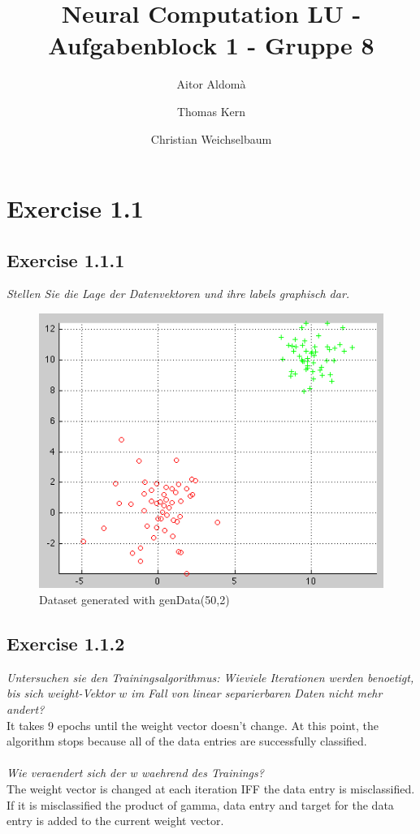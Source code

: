 \documentclass[10pt, journal,compsoc]{article}
\begin{document}
\title{Neural Computation LU - Aufgabenblock 1 - Gruppe 8}

\author{Aitor Aldomà \and Thomas Kern \and Christian Weichselbaum}
        

\section{Exercise 1.1}
\subsection{Exercise 1.1.1}
\textit{Stellen Sie die Lage der Datenvektoren und ihre labels graphisch dar.}

\begin{figure}[htp]
	\centering
	\includegraphics[width=1\textwidth]{ab1_1_1}
	\caption{Dataset generated with genData(50,2)}\label{fig:1}
\end{figure}

\subsection{Exercise 1.1.2}

\textit{Untersuchen sie den Trainingsalgorithmus: Wieviele Iterationen werden benoetigt, bis sich weight-Vektor $w$ im Fall von linear separierbaren Daten nicht mehr andert?}
\\
It takes 9 epochs until the weight vector doesn't change. At this point, the algorithm stops because all of the data entries are successfully classified.
\\
\\
\textit{Wie veraendert sich der w waehrend des Trainings?}
\\
The weight vector is changed at each iteration IFF the data entry is misclassified. If it is misclassified the product of gamma, data entry and target for the data entry is added to the current weight vector.
\\
\\
\end{document}

